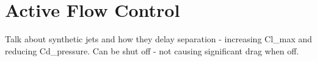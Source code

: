\section{Active Flow Control}

Talk about synthetic jets and how they delay separation - increasing Cl\_max and reducing Cd\_pressure.
Can be shut off - not causing significant drag when off.


